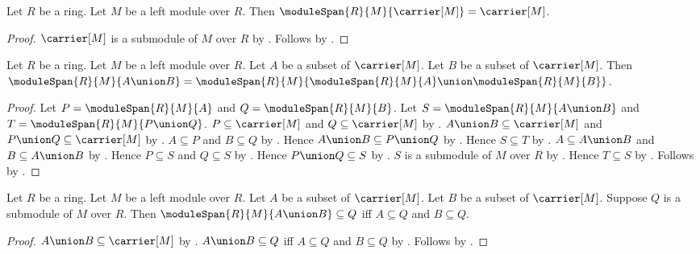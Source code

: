 \begin{theorem}\label{module_span_carrier}
    Let $R$ be a ring.
    Let $M$ be a left module over $R$.
    Then $\moduleSpan{R}{M}{\carrier[M]}=\carrier[M]$.
\end{theorem}
\begin{proof}
    $\carrier[M]$ is a submodule of $M$ over $R$ by
        .
    Follows by
        .
\end{proof}

\begin{theorem}\label{module_span_union}
    Let $R$ be a ring.
    Let $M$ be a left module over $R$.
    Let $A$ be a subset of $\carrier[M]$.
    Let $B$ be a subset of $\carrier[M]$.
    Then
        $\moduleSpan{R}{M}{A\union B}
            =\moduleSpan{R}{M}{
                \moduleSpan{R}{M}{A}\union
                \moduleSpan{R}{M}{B}}$.
\end{theorem}
\begin{proof}
    Let $P=\moduleSpan{R}{M}{A}$ and
        $Q=\moduleSpan{R}{M}{B}$.
    Let $S=\moduleSpan{R}{M}{A\union B}$ and
        $T=\moduleSpan{R}{M}{P\union Q}$.
    $P\subseteq\carrier[M]$ and $Q\subseteq\carrier[M]$ by
        .
    $A\union B\subseteq\carrier[M]$ and
        $P\union Q\subseteq\carrier[M]$ by
        .
    $A\subseteq P$ and $B\subseteq Q$ by
        .
    Hence $A\union B\subseteq P\union Q$ by
        .
    Hence $S\subseteq T$ by .
    $A\subseteq A\union B$ and $B\subseteq A\union B$ by
        .
    Hence $P\subseteq S$ and $Q\subseteq S$ by
        .
    Hence $P\union Q\subseteq S$ by .
    $S$ is a submodule of $M$ over $R$ by
        .
    Hence $T\subseteq S$ by .
    Follows by .
\end{proof}

\begin{theorem}\label{module_span_union_least_iff}
    Let $R$ be a ring.
    Let $M$ be a left module over $R$.
    Let $A$ be a subset of $\carrier[M]$.
    Let $B$ be a subset of $\carrier[M]$.
    Suppose $Q$ is a submodule of $M$ over $R$.
    Then $\moduleSpan{R}{M}{A\union B}\subseteq Q$ iff
        $A\subseteq Q$ and $B\subseteq Q$.
\end{theorem}
\begin{proof}
    $A\union B\subseteq\carrier[M]$ by
        .
    $A\union B\subseteq Q$ iff $A\subseteq Q$ and $B\subseteq Q$ by
        .
    Follows by .
\end{proof}

